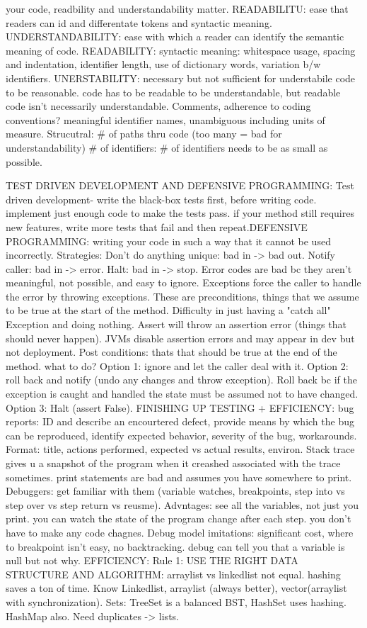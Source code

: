 \documentclass[10pt]{article}
\begin{document}
\begin{landscape}
\begin{multicols*}{6}
your code, readbility and understandability matter. READABILITU: ease that readers can id and differentate tokens and syntactic meaning. UNDERSTANDABILITY: ease with which a reader can identify the semantic meaning of code. READABILITY: syntactic meaning: whitespace usage, spacing and indentation, identifier length, use of dictionary words, variation b/w identifiers. UNERSTABILITY: necessary but not sufficient for understabile code to be reasonable. code has to be readable to be understandable, but readable code isn't necessarily understandable. Comments, adherence to coding conventions? meaningful identifier names, unambiguous including units of measure. Strucutral: \# of paths thru code (too many = bad for understandability) \# of identifiers: \# of identifiers needs to be as small as possible.

TEST DRIVEN DEVELOPMENT AND DEFENSIVE PROGRAMMING: Test driven development- write the black-box tests first, before writing code. implement just enough code to make the tests pass. if your method still requires new features, write more tests that fail and then repeat.DEFENSIVE PROGRAMMING: writing your code in such a way that it cannot be used incorrectly. Strategies: Don't do anything unique: bad in -> bad out. Notify caller: bad in -> error. Halt: bad in -> stop. Error codes are bad bc they aren't meaningful, not possible, and easy to ignore. Exceptions force the caller to handle the error by throwing exceptions. These are preconditions, things that we assume to be true at the start of the method. Difficulty in just having a "catch all" Exception and doing nothing. Assert will throw an assertion error (things that should never happen). JVMs disable assertion errors and may appear in dev but not deployment. Post conditions: thats that should be true at the end of the method. what to do? Option 1: ignore and let the caller deal with it. Option 2: roll back and notify (undo any changes and throw exception). Roll back bc if the exception is caught and handled the state must be assumed not to have changed. Option 3: Halt (assert False). FINISHING UP TESTING + EFFICIENCY: bug reports: ID and describe an encourtered defect, provide means by which the bug can be reproduced, identify expected behavior, severity of the bug, workarounds. Format: title, actions performed, expected vs actual results, environ. Stack trace gives u a snapshot of the program when it creashed associated with the trace sometimes. print statements are bad and assumes you have somewhere to print. Debuggers: get familiar with them (variable watches, breakpoints, step into vs step over vs step return vs reusme). Advntages: see all the variables, not just you print. you can watch the state of the program change after each step. you don't have to make any code chagnes. Debug model imitations: significant cost, where to breakpoint isn't easy, no backtracking. debug can tell you that a variable is null but not why. EFFICIENCY: Rule 1: USE THE RIGHT DATA STRUCTURE AND ALGORITHM: arraylist vs linkedlist not equal. hashing saves a ton of time. Know Linkedlist, arraylist (always better), vector(arraylist with synchronization). Sets: TreeSet is a balanced BST, HashSet uses hashing. HashMap also. Need duplicates -> lists. 
\end{multicols*}
\end{landscape}
\end{document}
